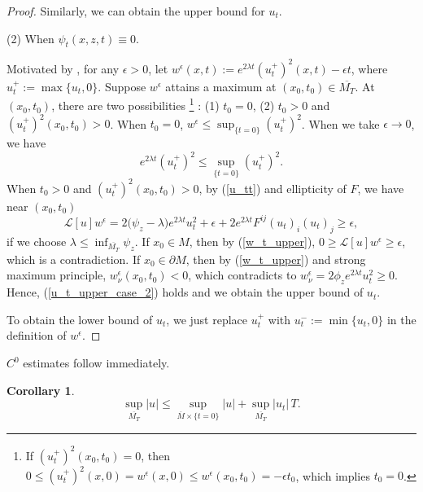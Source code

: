 \documentclass[12pt]{amsart}
\newtheorem{corollary}[theorem]{Corollary}
\theoremstyle{definition}
\theoremstyle{remark}
\numberwithin{equation}{section}
\begin{document}
\begin{proof}
	Similarly, we can obtain the upper bound for $u_t$.
	
	
	(2) When $\psi_t (x, z, t) \equiv 0$.
	
	Motivated by \cite{SchnurerSmoczyk03}, for any $\epsilon > 0$, let 
	$w^\epsilon (x, t) := e^{2\lambda t} (u_t^+)^2 (x, t) - \epsilon t$, where $u_t^+ := \max \{u_t, 0\}$.
	Suppose $w^\epsilon$ attains a maximum at $(x_0, t_0) \in \overline{M_T}$.
	At $(x_0, t_0)$, there are two possibilities
	\footnote{If $(u_t^+)^2(x_0, t_0) = 0$, then $0 \leq (u_t^+)^2(x, 0) = w^\epsilon(x, 0) \leq w^\epsilon(x_0, t_0) = -\epsilon t_0$, which implies $t_0 = 0$.}
	: (1) $t_0 = 0$, (2) $t_0 > 0$ and $(u_t^+)^2(x_0, t_0) > 0$.
	When $t_0 = 0$, $w^\epsilon \leq \sup_{\{t=0\}}(u_t^+)^2$. When we take $\epsilon \rightarrow 0$, we have
	\begin{equation}\label{u_t_upper_case_2}
	e^{2\lambda t}(u_t^+)^2 \leq \sup_{\{t=0\}}(u_t^+)^2.
	\end{equation}  
	When $t_0 > 0$ and $(u_t^+)^2(x_0, t_0) > 0$,
	by (\ref{u_tt}) and ellipticity of $F$, we have near $(x_0, t_0)$
	\begin{equation}\label{w_t_upper}
	\mathcal{L}[u] w^\epsilon = 2 \big(\psi_z - \lambda\big) e^{2\lambda t} u_t^2 + \epsilon + 2 e^{2\lambda t}F^{ij}(u_t)_i (u_t)_j \geq \epsilon,
	\end{equation}
	if we choose $\lambda \leq \inf_{\overline{M_T}} \psi_z$.
	If $x_0 \in M$, then by (\ref{w_t_upper}), $0 \geq \mathcal{L}[u] w^\epsilon \geq \epsilon$, which is a contradiction. 
	If $x_0 \in \partial M$, then by (\ref{w_t_upper}) and strong maximum principle, $w^\epsilon_\nu(x_0, t_0) < 0$, which contradicts to $w^\epsilon_\nu = 2\phi_z e^{2\lambda t} u_t^2 \geq 0$. Hence, (\ref{u_t_upper_case_2}) holds and we obtain the upper bound of $u_t$.
	
	To obtain the lower bound of $u_t$, we just replace $u_t^+$ with $u_t^- := \min \{u_t, 0\}$ in the definition of $w^\epsilon$.
\end{proof}


$C^0$ estimates follow immediately.
\begin{corollary}\label{para_C_0}
	\begin{equation}
	\sup_{\overline{M_T}} |u| \leq \sup_{\overline{M}\times \{t=0\}} |u| + \sup_{\overline{M_T}} |u_t|\, T.
	\end{equation}
\end{corollary}
\end{document}
